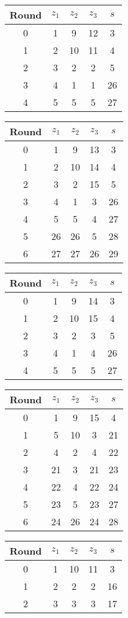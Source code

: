 \begin{tabular}{c | c | c | c | c }
Round & $z_1$ & $z_2$ & $z_3$ & $s$ \\
\hline
0 & 1 & 9 & 12 & 3 \\
1 & 2 & 10 & 11 & 4 \\
2 & 3 & 2 & 2 & 5 \\
3 & 4 & 1 & 1 & 26 \\
4 & 5 & 5 & 5 & 27
\end{tabular}

\begin{tabular}{c | c | c | c | c }
Round & $z_1$ & $z_2$ & $z_3$ & $s$ \\
\hline
0 & 1 & 9 & 13 & 3 \\
1 & 2 & 10 & 14 & 4 \\
2 & 3 & 2 & 15 & 5 \\
3 & 4 & 1 & 3 & 26 \\
4 & 5 & 5 & 4 & 27 \\
5 & 26 & 26 & 5 & 28 \\
6 & 27 & 27 & 26 & 29
\end{tabular}

\begin{tabular}{c | c | c | c | c }
Round & $z_1$ & $z_2$ & $z_3$ & $s$ \\
\hline
0 & 1 & 9 & 14 & 3 \\
1 & 2 & 10 & 15 & 4 \\
2 & 3 & 2 & 3 & 5 \\
3 & 4 & 1 & 4 & 26 \\
4 & 5 & 5 & 5 & 27
\end{tabular}

\begin{tabular}{c | c | c | c | c }
Round & $z_1$ & $z_2$ & $z_3$ & $s$ \\
\hline
0 & 1 & 9 & 15 & 4 \\
1 & 5 & 10 & 3 & 21 \\
2 & 4 & 2 & 4 & 22 \\
3 & 21 & 3 & 21 & 23 \\
4 & 22 & 4 & 22 & 24 \\
5 & 23 & 5 & 23 & 27 \\
6 & 24 & 26 & 24 & 28
\end{tabular}

\begin{tabular}{c | c | c | c | c }
Round & $z_1$ & $z_2$ & $z_3$ & $s$ \\
\hline
0 & 1 & 10 & 11 & 3 \\
1 & 2 & 2 & 2 & 16 \\
2 & 3 & 3 & 3 & 17
\end{tabular}

